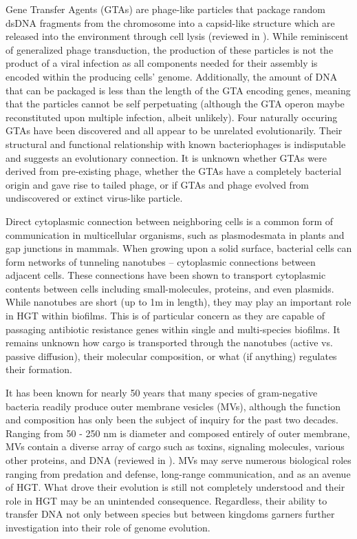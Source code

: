  Gene Transfer Agents (GTAs) are  phage-like particles that package random dsDNA
 fragments from the chromosome into a capsid-like structure which are released
 into the environment through cell lysis (reviewed in \citet{Lang:2012df}). While
 reminiscent of generalized phage transduction, the production of these
 particles is not the product of a viral infection as all components needed for
 their assembly is encoded within the producing cells' genome. Additionally, the
 amount of DNA that can be packaged is less than the length of the GTA encoding
 genes, meaning that the particles cannot be self perpetuating (although the GTA
 operon maybe reconstituted upon multiple infection, albeit unlikely). Four
 naturally occuring GTAs have been discovered and all appear to be unrelated
 evolutionarily. Their structural and functional relationship with known
 bacteriophages is indisputable and suggests an evolutionary connection. It is
 unknown whether GTAs were derived from pre-existing phage, whether the GTAs
 have a completely bacterial origin and gave rise to tailed phage, or if GTAs
 and phage evolved from undiscovered or extinct virus-like particle.

Direct cytoplasmic connection between neighboring cells is a common form of
communication in multicellular organisms, such as plasmodesmata in
plants\cite{Heinlein:2004fa} and gap junctions in mammals\cite{Kumar:1996tm}.
When growing upon a solid surface, bacterial cells can form networks of
tunneling nanotubes -- cytoplasmic connections between adjacent
cells\cite{Dubey:2011dp}. These connections have been shown to transport
cytoplasmic contents between cells including small-molecules, proteins, and even
plasmids. While nanotubes are short (up to 1\textmu m in length), they may play
an important role in HGT within biofilms.  This is of particular concern as they
are capable of passaging antibiotic resistance genes within single and
multi-species biofilms. It remains unknown how cargo is transported through the
nanotubes (active vs. passive diffusion), their molecular composition, or what
(if anything) regulates their formation.

It has been known for nearly 50 years that many species of gram-negative
bacteria readily produce outer membrane vesicles (MVs), although the function
and composition has only been the subject of inquiry for the past two decades.
Ranging from 50 - 250 nm is diameter and composed entirely of outer membrane,
MVs contain a diverse array of cargo such as toxins, signaling molecules,
various other proteins, and DNA (reviewed in \citet{MashburnWarren:2006jc}). MVs
may serve numerous biological roles ranging from predation and defense,
long-range communication, and as an avenue of HGT. What drove their evolution is
still not completely understood and their role in HGT may be an unintended
consequence. Regardless, their ability to transfer DNA not only between species
but between kingdoms garners further investigation into their role of genome evolution.



